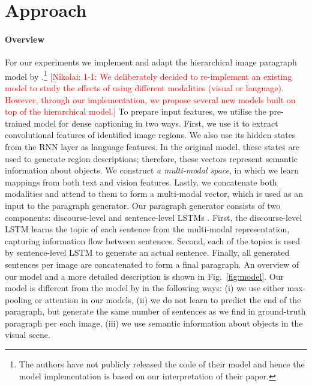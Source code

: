 \documentclass[11pt,a4paper]{article}
\newcommand{\kibitz}[2]{\ifnum\Comments=1\textcolor{#1}{#2}\fi}
\newcommand{\nikolai}[1]{\kibitz{red}  {[Nikolai: #1]}}
\begin{document}
\section{Approach}
\paragraph{Overview}
For our experiments we implement and adapt the hierarchical image paragraph model by \citet{krause2016hierarchical}.\footnote{The authors have not publicly released the code of their model and hence the model implementation is based on our interpretation of their paper.}
\nikolai{1-1: We deliberately decided to re-implement an existing model to study the effects of using different modalities (visual or language).
However, through our implementation, we propose several new models built on top of the hierarchical model.}
To prepare input features, we utilise the pre-trained model for dense captioning \cite{densecap} in two ways.
First, we use it to extract convolutional features of identified image regions.
We also use its hidden states from the RNN layer as language features.
In the original model, these states are used to generate region descriptions; therefore, these vectors represent semantic information about objects.
We construct \textit{a multi-modal space}, in which we learn mappings from both text and vision features.
Lastly, we concatenate both modalities and attend to them to form a multi-modal vector, which is used as an input to the paragraph generator.
Our paragraph generator consists of two components: discourse-level and sentence-level LSTMs \cite{lstm97}.
First, the discourse-level LSTM learns the topic of each sentence from the multi-modal representation, capturing information flow between sentences.
Second, each of the topics is used by sentence-level LSTM to generate an actual sentence.
Finally, all generated sentences per image are concatenated to form a final paragraph.
An overview of our model and a more detailed description is shown in Fig.~\ref{fig:model}.
Our model is different from the model by  in the following ways: (i) we use either max-pooling or attention in our models, (ii) we do not learn to predict the end of the paragraph, but generate the same number of sentences as we find in ground-truth paragraph per each image, (iii) we use semantic information about objects in the visual scene.
\end{document}
